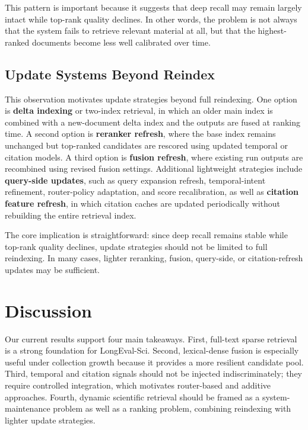 \documentclass[11pt]{article}
\begin{document}
This pattern is important because it suggests that deep recall may remain largely intact while top-rank quality declines. In other words, the problem is not always that the system fails to retrieve relevant material at all, but that the highest-ranked documents become less well calibrated over time.

\subsection{Update Systems Beyond Reindex}

This observation motivates update strategies beyond full reindexing. One option is \textbf{delta indexing} or two-index retrieval, in which an older main index is combined with a new-document delta index and the outputs are fused at ranking time. A second option is \textbf{reranker refresh}, where the base index remains unchanged but top-ranked candidates are rescored using updated temporal or citation models. A third option is \textbf{fusion refresh}, where existing run outputs are recombined using revised fusion settings. Additional lightweight strategies include \textbf{query-side updates}, such as query expansion refresh, temporal-intent refinement, router-policy adaptation, and score recalibration, as well as \textbf{citation feature refresh}, in which citation caches are updated periodically without rebuilding the entire retrieval index.

The core implication is straightforward: since deep recall remains stable while top-rank quality declines, update strategies should not be limited to full reindexing. In many cases, lighter reranking, fusion, query-side, or citation-refresh updates may be sufficient.

\section{Discussion}

Our current results support four main takeaways. First, full-text sparse retrieval is a strong foundation for LongEval-Sci. Second, lexical-dense fusion is especially useful under collection growth because it provides a more resilient candidate pool. Third, temporal and citation signals should not be injected indiscriminately; they require controlled integration, which motivates router-based and additive approaches. Fourth, dynamic scientific retrieval should be framed as a system-maintenance problem as well as a ranking problem, combining reindexing with lighter update strategies.
\end{document}
